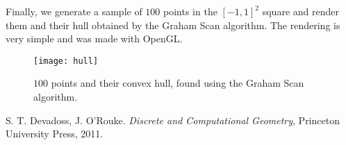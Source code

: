 \documentclass[a4paper, 10pt, conference]{ieeeconf}      %
\begin{document}
Finally, we generate a sample of $100$ points in the $[-1,1]^2$ square and render them and their hull obtained by the Graham Scan algorithm.
The rendering is very simple and was made with OpenGL.

\begin{figure}[h]
	\begin{center}
   		\texttt{[image: hull]}
    	\caption{$100$ points and their convex hull, found using the Graham Scan algorithm.}
    \end{center}
\end{figure}




\begin{thebibliography}{99}

S. T. Devadoss, J. O'Rouke.
\textit{Discrete and Computational Geometry}, 
Princeton University Press, 2011.

\end{thebibliography}
\end{document}
